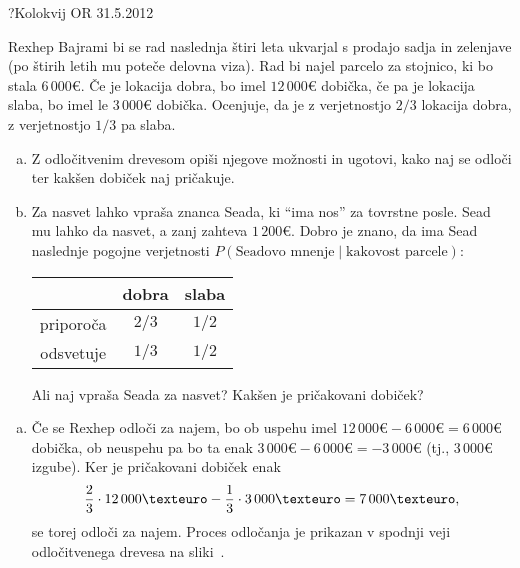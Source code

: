 \begin{naloga}{?}{Kolokvij OR 31.5.2012}
\begin{vprasanje}
Rexhep Bajrami bi se rad naslednja štiri leta
ukvarjal s prodajo sadja in zelenjave
(po štirih letih mu poteče delovna viza).
Rad bi najel parcelo za stojnico, ki bo stala $6\,000 €$.
Če je lokacija dobra, bo imel $12\,000 €$ dobička,
če pa je lokacija slaba, bo imel le $3\,000 €$ dobička.
Ocenjuje, da je z verjetnostjo $2/3$ lokacija dobra,
z verjetnostjo $1/3$ pa slaba.
\begin{enumerate}[(a)]
\item Z odločitvenim drevesom opiši njegove možnosti in ugotovi,
kako naj se odloči ter kakšen dobiček naj pričakuje.
\item Za nasvet lahko vpraša znanca Seada, ki ``ima nos'' za tovrstne posle.
Sead mu lahko da nasvet, a zanj zahteva $1\,200 €$.
Dobro je znano, da ima Sead naslednje pogojne verjetnosti
$P(\text{Seadovo mnenje} \; | \; \text{kakovost parcele})$:
\begin{center}
\begin{tabular}{c|cc}
& dobra & slaba \\
\hline
priporoča & $2/3$ & $1/2$ \\
odsvetuje & $1/3$ & $1/2$
\end{tabular}
\end{center}
Ali naj vpraša Seada za nasvet?
Kakšen je pričakovani dobiček?
\end{enumerate}
\end{vprasanje}

\begin{odgovor}
\begin{enumerate}[(a)]
\item Če se Rexhep odloči za najem,
bo ob uspehu imel $12\,000 € - 6\,000 € = 6\,000 €$ dobička,
ob neuspehu pa bo ta enak $3\,000 € - 6\,000 € = -3\,000 €$
(tj., $3\,000 €$ izgube).
Ker je pričakovani dobiček enak
$$
{2 \over 3} \cdot 12\,000 € - {1 \over 3} \cdot 3\,000 € = 7\,000 € ,
$$
se torej odloči za najem.
Proces odločanja je prikazan
v spodnji veji od\-lo\-čit\-ve\-ne\-ga drevesa na sliki~\fig.


\end{enumerate}
\end{odgovor}
\end{naloga}
